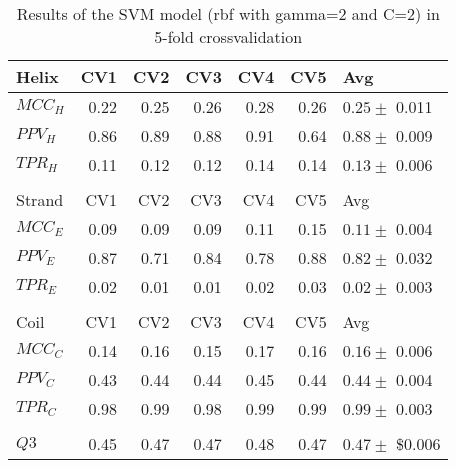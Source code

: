 \documentclass[11pt]{article}
\begin{document}
\begin{table}[htbp]
\caption{Results of the SVM model (rbf with gamma=2 and C=2) in 5-fold crossvalidation}
\centering
\begin{tabular}{lrrrrrl}
Helix & CV1 & CV2 & CV3 & CV4 & CV5 & Avg\\
\hline
\(MCC_H\) & 0.22 & 0.25 & 0.26 & 0.28 & 0.26 & \(0.25 \pm\) 0.011\\
\(PPV_H\) & 0.86 & 0.89 & 0.88 & 0.91 & 0.64 & \(0.88 \pm\) 0.009\\
\(TPR_H\) & 0.11 & 0.12 & 0.12 & 0.14 & 0.14 & \(0.13 \pm\) 0.006\\
 &  &  &  &  &  & \\
Strand & CV1 & CV2 & CV3 & CV4 & CV5 & Avg\\
\hline
\(MCC_E\) & 0.09 & 0.09 & 0.09 & 0.11 & 0.15 & \(0.11 \pm\) 0.004\\
\(PPV_E\) & 0.87 & 0.71 & 0.84 & 0.78 & 0.88 & \(0.82 \pm\)  0.032\\
\(TPR_E\) & 0.02 & 0.01 & 0.01 & 0.02 & 0.03 & \(0.02 \pm\)  0.003\\
 &  &  &  &  &  & \\
Coil & CV1 & CV2 & CV3 & CV4 & CV5 & Avg\\
\hline
\(MCC_C\) & 0.14 & 0.16 & 0.15 & 0.17 & 0.16 & \(0.16 \pm\) 0.006\\
\(PPV_C\) & 0.43 & 0.44 & 0.44 & 0.45 & 0.44 & \(0.44 \pm\) 0.004\\
\(TPR_C\) & 0.98 & 0.99 & 0.98 & 0.99 & 0.99 & \(0.99 \pm\) 0.003\\
 &  &  &  &  &  & \\
\hline
\(Q3\) & 0.45 & 0.47 & 0.47 & 0.48 & 0.47 & \(0.47 \pm\) \$0.006\\
\end{tabular}
\end{table}
\end{document}
